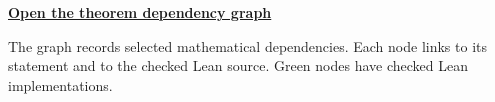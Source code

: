 \documentclass[11pt]{article}
\begin{document}
\maketitle
\noindent\href{dependency-graph.svg}{\textbf{Open the theorem dependency graph}}\par
The graph records selected mathematical dependencies. Each node links to its
statement and to the checked Lean source. Green nodes have checked Lean implementations.
\tableofcontents

\end{document}
